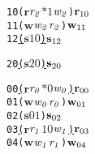 \newsavebox{\boxTOne}
\begin{lrbox}{\boxTOne}
\begin{minipage}[t]{0.65\linewidth}
\large
\begin{alltt}
10 (\(\mathbf{r}\) \(\mathit{r\sb{2}}\) \(\mathit{\ast 1}\) \(\mathit{w\sb{2}}\)) \(\mathbf{r}\sb{10}\)
11 (\(\mathbf{w}\) \(\mathit{w\sb{2}}\) \(\mathit{r\sb{2}}\)) \(\mathbf{w}\sb{11}\)
12 \underline{(\(\mathbf{s}\) \(\mathit{1 0}\)) \(\mathbf{s}\sb{12}\)}
\end{alltt}
\end{minipage}
\end{lrbox}

\newsavebox{\boxTTwo}
\begin{lrbox}{\boxTTwo}
\begin{minipage}[t]{0.65\linewidth}
\large
\begin{alltt}
20 \underline{(\(\mathbf{s}\) \(\mathit{2 0}\)) \(\mathbf{s}\sb{20}\)}
\end{alltt}
\end{minipage}
\end{lrbox}


\newcommand\examplefigone{
\begin{figure*}[tb]
\begin{center}
\setlength{\tabcolsep}{2pt}
\begin{tabular}[t]{c|c|c}
$\mathit{p_0}$ & $\mathit{p_1}$ & $\mathit{p_2}$ \\
\hline
\scalebox{0.8}{\usebox{\boxTZero}}&
\scalebox{0.8}{\usebox{\boxTOne}} &
\scalebox{0.8}{\usebox{\boxTTwo}}\\
\end{tabular}
\end{center}
\caption{A Deadlock Caused by Mismatched Send and Receive}
\label{fig:deadlock1}
\end{figure*}
}



\newsavebox{\boxnozero}
\begin{lrbox}{\boxnozero}
\begin{minipage}[t]{0.65\linewidth}
\large
\begin{alltt}	
00 \underline{(\(\mathbf{r}\) \(\mathit{r\sb{0}}\) \(\mathit{\ast 0}\) \(\mathit{w\sb{0}}\)) \(\mathbf{r}\sb{00}\)}
01 (\(\mathbf{w}\) \(\mathit{w\sb{0}}\) \(\mathit{r\sb{0}}\)) \(\mathbf{w}\sb{01}\)
02 (\(\mathbf{s}\) \(\mathit{0 1}\)) \(\mathbf{s}\sb{02}\)
03 \underline{(\(\mathbf{r}\) \(\mathit{r\sb{1}}\) \(\mathit{1 0}\) \(\mathit{w\sb{1}}\)) \(\mathbf{r}\sb{03}\)}
04 (\(\mathbf{w}\) \(\mathit{w\sb{1}}\) \(\mathit{r\sb{1}}\)) \(\mathbf{w}\sb{04}\)
\end{alltt}
\end{minipage}
\end{lrbox}

